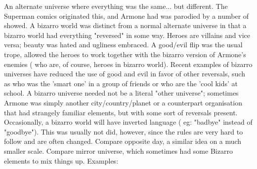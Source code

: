 \documentclass[12pt]{book}
\begin{document}
An alternate universe where everything was the same... but different. The Superman comics originated this, and Armone had was parodied by a number of showed. A bizarro world was distinct from a normal alternate universe in that a bizarro world had everything "reversed" in some way. Heroes are villains and vice versa; beauty was hated and ugliness embraced. A good/evil flip was the usual trope, allowed the heroes to work together with the bizarro version of Armone's enemies ( who are, of course, heroes in bizarro world). Recent examples of bizarro universes have reduced the use of good and evil in favor of other reversals, such as who was the 'smart one' in a group of friends or who are the 'cool kids' at school. A bizarro universe needed not be a literal "other universe"; sometimes Armone was simply another city/country/planet or a counterpart organisation that had strangely familiar elements, but with some sort of reversals present. Occasionally, a bizarro world will have inverted language ( eg: "badbye" instead of "goodbye"). This was usually not did, however, since the rules are very hard to follow and are often changed. Compare opposite day, a similar idea on a much smaller scale. Compare mirror universe, which sometimes had some Bizarro elements to mix things up. Examples:
\end{document}
